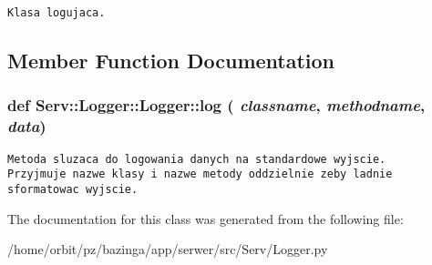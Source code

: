 \footnotesize\begin{verbatim}Klasa logujaca.\end{verbatim}
\normalsize
 

\subsection{Member Function Documentation}
\hypertarget{class_serv_1_1_logger_1_1_logger_03728c5f5817396e373bde7861b69d69}{
\subsubsection[{log}]{\setlength{\rightskip}{0pt plus 5cm}def {\bf Serv::Logger::Logger::log} ( {\em classname}, \/   {\em methodname}, \/   {\em data})}}
\label{class_serv_1_1_logger_1_1_logger_03728c5f5817396e373bde7861b69d69}




\footnotesize\begin{verbatim}Metoda sluzaca do logowania danych na standardowe wyjscie.
Przyjmuje nazwe klasy i nazwe metody oddzielnie zeby ladnie sformatowac wyjscie.
\end{verbatim}
\normalsize
 

The documentation for this class was generated from the following file:\begin{CompactItemize}
\item 
/home/orbit/pz/bazinga/app/serwer/src/Serv/Logger.py\end{CompactItemize}
